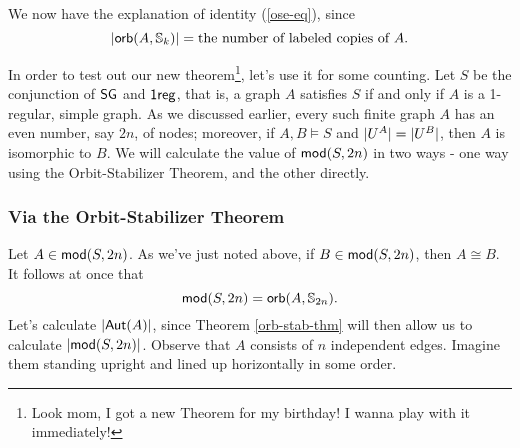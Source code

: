 We now have the explanation of identity (\ref{ose-eq}), since 
\[
\mbox{$|\mbox{$\mathsf{orb}(A,\mbox{$\mathbb{S}_{k}$})$}|$}=\mbox{the number of labeled copies of }A.
\]

In order to test out our new theorem\footnote{Look mom, I got a new Theorem for my birthday! I wanna play with it immediately!}, let's use it for some counting. Let $S$ be the conjunction of $\mbox{$\mathsf{SG}$}$ and $\mbox{$\mathsf{1reg}$}$, that is, a graph $A$ satisfies $S$ if and only if $A$ is a 1-regular, simple graph. As we discussed earlier, every such finite graph $A$ has an even number, say $2n$, of nodes; moreover, if $A,B\models S$ and $\mbox{$|U^A|$}=\mbox{$|U^B|$}$, then $A$ is isomorphic to $B$. We will calculate the value of $\mbox{$\mathsf {mod}(S,2n)$}$ in two ways - one way using the Orbit-Stabilizer Theorem, and the other directly. 

\subsubsection*{Via the Orbit-Stabilizer Theorem}
Let $A\in\mbox{$\mathsf {mod}(S,2n)$}$. As we've just noted above, if $B\in\mbox{$\mathsf {mod}(S,2n)$}$, then $A\cong B$. It follows at once that 
\begin{equation}\label{vos-eq}
\mbox{$\mathsf {mod}(S,2n)$}=\mbox{$\mathsf{orb}(A,\mbox{$\mathbb{S}_{2n}$})$}.
\end{equation}
Let's calculate $\mbox{$|\mbox{$\mathsf{Aut}(A)$}|$}$, since Theorem \ref{orb-stab-thm} will then allow us to calculate $\mbox{$|\mbox{$\mathsf {mod}(S,2n)$}|$}$. Observe that $A$ consists of $n$ independent edges. Imagine them standing upright and lined up horizontally in some order. 

\begin{center}
\end{center}

